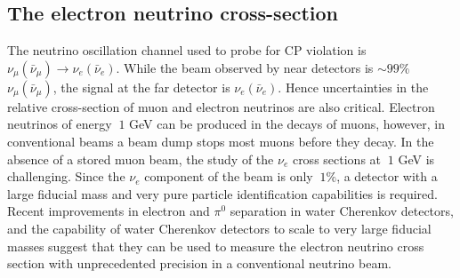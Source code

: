 \subsection{The electron neutrino cross-section}
The neutrino oscillation channel used to probe for CP violation is $\nu_{\mu}(\bar{\nu}_{\mu})\rightarrow\nu_{e}(\bar{\nu}_{e})$.
While the beam observed by near detectors is $\sim99\%$ $\nu_{\mu}(\bar{\nu}_{\mu})$, the signal at the far detector
is $\nu_{e}(\bar{\nu}_{e})$.  Hence uncertainties in the relative cross-section of muon and electron neutrinos are also
critical.  Electron neutrinos of energy $~1$ GeV can be produced in the decays of muons, however, in conventional beams a
beam dump stops most muons before they decay.
In the absence of a stored muon beam, the study of the $\nu_{e}$ cross sections at $~1$ GeV is challenging.  Since the
$\nu_{e}$ component of the beam is only $~1\%$, a detector with a large fiducial mass and very pure particle identification 
capabilities is required.  Recent improvements in electron and $\pi^{0}$ separation in water Cherenkov detectors, and the capability 
of water Cherenkov detectors to scale to very large fiducial masses suggest that they can be used to measure the electron
neutrino cross section with unprecedented precision in a conventional neutrino beam.


